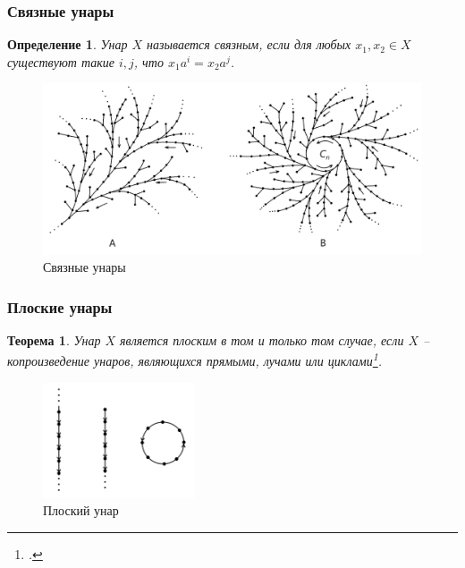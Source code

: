 \documentclass[11pt, notheorems]{beamer}
\newtheorem{definition}{Определение}
\newtheorem{theorem}{Теорема}
\begin{document}
\begin{frame}
	\frametitle{Связные унары}

	\begin{definition}
		Унар $X$ называется \textit{связным}, если для любых $x_1, x_2 \in X$ существуют такие $i, j$, что $x_1 a^i = x_2 a^j$.
	\end{definition}

	\pause

	\begin{figure}
		\center
		\includegraphics[width=1.0\textwidth]{connected_unars}
		\caption{Связные унары}
	\end{figure}
\end{frame}

\begin{frame}
	\frametitle{Плоские унары}

	\begin{theorem}
		Унар $X$ является плоским в том и только том случае, если $X$ -- копроизведение унаров, являющихся прямыми, лучами или циклами\footcite[теорема]{flat_unars}.
	\end{theorem}

	\begin{figure}
		\center
		\includegraphics[width=0.4\textwidth]{flat_unar_1.png}
		\caption{Плоский унар}
	\end{figure}
\end{frame}
\end{document}
